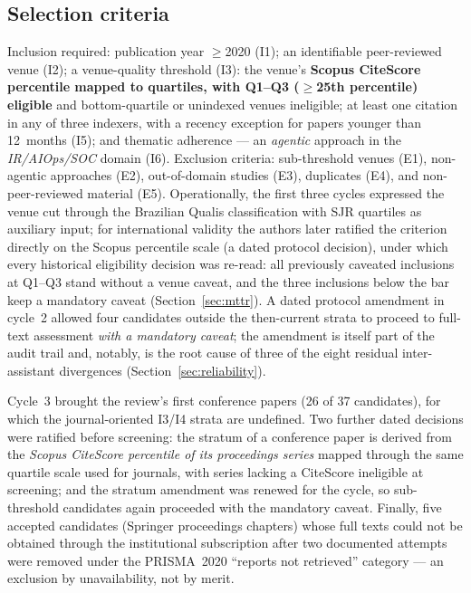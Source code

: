 \documentclass{ieeeaccess}
\begin{document}
\subsection{Selection criteria}
Inclusion required: publication year $\geq$2020 (I1); an identifiable
peer-reviewed venue (I2); a venue-quality threshold (I3): the venue's
\textbf{Scopus CiteScore percentile mapped to quartiles, with Q1--Q3
($\geq$25th percentile) eligible} and bottom-quartile or unindexed venues
ineligible; at least one citation in any of three indexers, with a
recency exception for papers younger than 12~months (I5); and thematic
adherence --- an \emph{agentic} approach in the \emph{IR/AIOps/SOC}
domain (I6). Exclusion criteria: sub-threshold venues (E1), non-agentic
approaches (E2), out-of-domain studies (E3), duplicates (E4), and
non-peer-reviewed material (E5). Operationally, the first three cycles
expressed the venue cut through the Brazilian Qualis classification with
SJR quartiles as auxiliary input; for international validity the
authors later ratified the criterion directly on the Scopus percentile
scale (a dated protocol decision), under which every historical
eligibility decision was re-read: all previously caveated inclusions at
Q1--Q3 stand without a venue caveat, and the three inclusions below the
bar keep a mandatory caveat (Section~\ref{sec:mttr}). A dated protocol
amendment in cycle~2 allowed four candidates outside the then-current
strata to proceed to full-text assessment \emph{with a mandatory
caveat}; the amendment is itself part of the audit trail and, notably,
is the root cause of three of the eight residual inter-assistant
divergences (Section~\ref{sec:reliability}).

Cycle~3 brought the review's first conference papers (26 of 37
candidates), for which the journal-oriented I3/I4 strata are undefined.
Two further dated decisions were ratified before screening: the stratum
of a conference paper is derived from the \emph{Scopus CiteScore
percentile of its proceedings series} mapped through the same
quartile scale used for journals, with series lacking a
CiteScore ineligible at screening; and the stratum amendment was renewed
for the cycle, so sub-threshold candidates again proceeded with the
mandatory caveat. Finally, five accepted candidates (Springer proceedings
chapters) whose full texts could not be obtained through the
institutional subscription after two documented attempts were removed
under the PRISMA~2020 ``reports not retrieved'' category --- an exclusion
by unavailability, not by merit.
\end{document}
